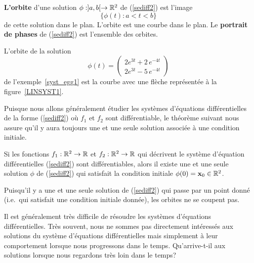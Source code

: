 {\begin{focus}{\dfn} 
{\bfseries L'orbite} d'une solution $\phi:]a,b[\rightarrow \mathbb{R}^2$ de
(\ref{sediff2}) est l'image
\[
\{ \phi(t) :  a < t < b \}
\]
de cette solution dans le plan.  L'orbite est une courbe dans le plan.
Le {\bfseries portrait de phases} de (\ref{sediff2}) est l'ensemble
des orbites.
\end{focus}

\begin{egg}
L'orbite de la solution 
\[
\phi(t) =
\begin{pmatrix}
2 e^{3t}+ 2\,e^{-4t} \\ 2 e^{3t} - 5\,e^{-4t}
\end{pmatrix}
\]
de l'exemple~\ref{syst_egg1} est la courbe avec une flèche représentée
à la figure~\ref{LINSYST1}.
\end{egg}


Puisque nous allons généralement étudier les systèmes d'équations
différentielles de la forme (\ref{sediff2}) où $f_1$ et $f_2$ sont
différentiable, le théorème suivant nous assure qu'il y aura toujours
une et une seule solution associée à une condition initiale.

\begin{focus}{\thm}
Si les fonctions $f_1:\mathbb{R}^2 \rightarrow \mathbb{R}$ et $f_2:\mathbb{R}^2\rightarrow \mathbb{R}$
qui décrivent le système d'équation différentielles
(\ref{sediff2}) sont différentiables, alors il existe une et une seule 
solution $\phi$ de (\ref{sediff2}) qui satisfait la condition initiale
$\phi(0) = \mathbf{x}_0 \in \mathbb{R}^2$.
\end{focus}

\begin{rmk}
Puisqu'il y a une et une seule solution de (\ref{sediff2}) qui passe par un
point donné (i.e.\ qui satisfait une condition initiale donnée), les orbites
ne se coupent pas.
\end{rmk}

Il est généralement très difficile de résoudre les systèmes d'équations
différentielles.  Très souvent, nous ne sommes pas directement intéressés aux
solutions du système d'équations différentielles mais simplement à leur
comportement lorsque nous progressons dans le temps. Qu'arrive-t-il aux
solutions lorsque nous regardons très loin dans le temps?

}
